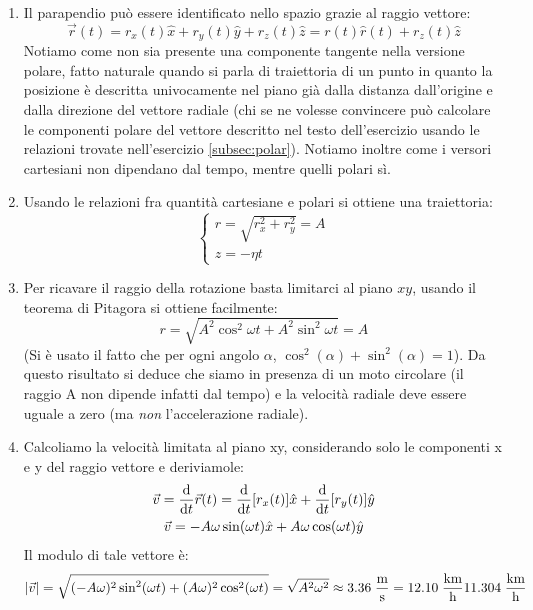 \documentclass[12pt,a4paper]{book}
\begin{document}
\begin{enumerate}[label=\alph*)]
\item  Il parapendio può essere identificato nello spazio grazie al raggio vettore: 
%
\begin{equation*}
\vec{r}(t)=r_x(t)\hat{x}+r_y(t)\hat{y}+r_z(t)\hat{z}=r(t)\hat{r}(t)+r_z(t)\hat{z}
\end{equation*}
%
Notiamo come non sia presente una componente tangente nella versione polare, fatto naturale quando si parla di traiettoria di un punto in quanto la posizione è descritta univocamente nel piano già dalla distanza dall'origine e dalla direzione del vettore radiale (chi se ne volesse convincere può calcolare le componenti polare del vettore descritto nel testo dell'esercizio usando le relazioni trovate nell'esercizio \ref{subsec:polar}). Notiamo inoltre come i versori cartesiani non dipendano dal tempo, mentre quelli polari sì.
\item Usando le relazioni fra quantità cartesiane e polari si ottiene una traiettoria:
%
\[
\begin{cases}
	r=\sqrt{r_x^2+r_y^2}=A \\
    z=-\eta t
\end{cases}
\]
%
\item Per ricavare il raggio della rotazione basta limitarci al piano $xy$, usando il teorema di Pitagora si ottiene facilmente:
%
\begin{equation*}
r=\sqrt{A^2\cos^2\omega t+A^2\sin^2\omega t}= A 
\end{equation*}
%
(Si è usato il fatto che per ogni angolo $\alpha$, $\cos^2(\alpha) + \sin^2(\alpha)=1$). Da questo risultato si deduce che siamo in presenza di un moto circolare (il raggio A non dipende infatti dal tempo) e la velocità radiale deve essere uguale a zero (ma \textit{non} l'accelerazione radiale).
\item Calcoliamo la velocità limitata al piano xy, considerando solo le componenti x e y del raggio vettore e deriviamole:
%
\begin{gather*}
\vec{v}=\dv{t}\vec{r}(t)=\dv{t}[r_x(t)]\hat{x}+\dv{t}[r_y(t)]\hat{y}\\
\vec{v}=-A\omega\sin(\omega t)\hat{x}+A\omega\cos(\omega t)\hat{y}
\end{gather*}
%
Il modulo di tale vettore è:
%
\begin{gather*}
\qty|\vec{v}|=\sqrt{(-A\omega)^2\sin^2(\omega t)+(A\omega)^2\cos^2(\omega t)}=\sqrt{A^2\omega^2}\approx 3.36\;\frac{\text{m}}{\text{s}}=12.10\;\frac{\text{km}}{\text{h}} 11.304\;\frac{\text{km}}{\text{h}}

\end{gather*}
\end{enumerate}
\end{document}

